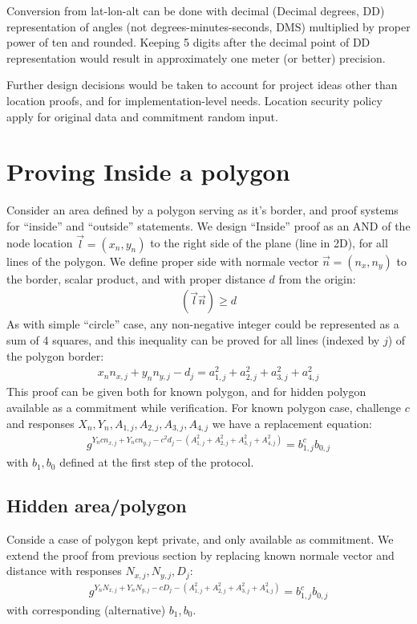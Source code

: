 \documentclass[a4paper,12pt]{article}
\begin{document}
Conversion from lat-lon-alt
can be done with decimal (Decimal degrees, DD) representation of angles (not degrees-minutes-seconds, DMS)
multiplied by proper power of ten and rounded.
Keeping 5 digits after the decimal point of DD representation would result in
approximately one meter (or better) precision.

Further design decisions would be taken
to account for project ideas other than location proofs,
and for implementation-level needs.
Location security policy apply for original data and commitment random input.

\section{Proving Inside a polygon}

Consider an area defined by a polygon serving as it's border,
and proof systems for ``inside'' and ``outside'' statements.
We design ``Inside'' proof as an AND of the node location $\vec l = (x_n, y_n)$ to the right side of the plane (line in 2D),
for all lines of the polygon.
We define proper side with normale vector $\vec n = (n_x, n_y)$ to the border, scalar product, and with proper distance $d$ from the origin:
\begin{gather}
  (\vec l \vec n) \ge d
\end{gather}
As with simple ``circle'' case, any non-negative integer could be represented as a sum of 4 squares,
and this inequality can be proved for all lines (indexed by $j$) of the polygon border:
\begin{gather}
  x_n n_{x,j} + y_n n_{y,j} - d_j = a_{1,j}^2 + a_{2,j}^2 + a_{3,j}^2 + a_{4,j}^2
\end{gather}
This proof can be given both for known polygon, and for hidden polygon available as a commitment while verification.
For known polygon case, challenge $c$ and responses $X_n, Y_n, A_{1,j}, A_{2,j}, A_{3,j}, A_{4,j}$
we have a replacement equation:
\begin{gather}
  g^{Y_n c n_{x,j} + Y_n c n_{y,j} - c^2 d_j - (A_{1,j}^2 + A_{2,j}^2 + A_{3,j}^2 + A_{4,j}^2)} = b_{1,j}^c b_{0,j}
\end{gather}
with $b_1, b_0$ defined at the first step of the protocol.

\subsection{Hidden area/polygon}

Conside a case of polygon kept private, and only available as commitment.
We extend the proof from previous section
by replacing known normale vector and distance with responses $N_{x,j}, N_{y,j}, D_j$:
\begin{gather}
  g^{Y_n N_{x,j} + Y_n N_{y,j} - c D_j - (A_{1,j}^2 + A_{2,j}^2 + A_{3,j}^2 + A_{4,j}^2)} = b_{1,j}^c b_{0,j}
\end{gather}
with corresponding (alternative) $b_1, b_0$.
\end{document}
